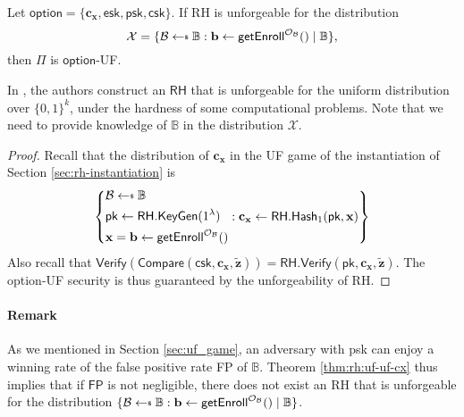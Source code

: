 \begin{theorem}
\label{thm:rh:uf-uf-cx}

Let $\textsf{option} = \{\mathbf{c_x}, \textsf{esk}, \textsf{psk}, \textsf{csk}\}$. If \textsf{RH} is unforgeable for the distribution
\[
	\mathcal{X} = \{ \mathcal{B} \getsdollar \mathbb{B}: \mathbf{b} \gets {\sf getEnroll}^{\mathcal{O}_\mathcal{B}}() \mid \mathbb{B} \},
\]
then $\Pi$ is $\textsf{option}$-UF. 

\end{theorem}

In \cite{cryptoeprint:2014/394}, the authors construct an $\textsf{RH}$ that is unforgeable for the uniform distribution over $\{0, 1\}^k$, under the hardness of some computational problems. Note that we need to provide knowledge of $\mathbb{B}$ in the distribution $\mathcal{X}$.

\begin{proof}

Recall that the distribution of $\mathbf{c_x}$ in the \textsf{UF} game of the instantiation of Section \ref{sec:rh-instantiation} is
\[
	\left \{
		\begin{aligned} 
			 & \mathcal{B} \getsdollar \mathbb{B} \\
			 & \textsf{pk} \gets \textsf{RH.KeyGen}(1^\lambda) \\
			 & \mathbf{x} = \mathbf{b} \gets \textsf{getEnroll}^{\mathcal{O}_\mathcal{B}}() 
		\end{aligned} :
		\mathbf{c_x} \gets \textsf{RH.Hash}_1(\textsf{pk}, \mathbf{x})
	\right \}
\]
Also recall that $\textsf{Verify}(\textsf{Compare}(\textsf{csk}, \mathbf{c_x}, \mathbf{\tilde{z}} )) = \textsf{RH.Verify}(\textsf{pk}, \mathbf{c_x}, \mathbf{\tilde{z}} )$.
The \textsf{option}-UF security is thus guaranteed by the unforgeability of \textsf{RH}.

\end{proof}

\paragraph{Remark}
As we mentioned in Section \ref{sec:uf_game}, an adversary with \textsf{psk} can enjoy a winning rate of the false positive rate \textsf{FP} of $\mathbb{B}$. Theorem \ref{thm:rh:uf-uf-cx} thus implies that if $\textsf{FP}$ is not negligible, there does not exist an \textsf{RH} that is unforgeable for the distribution $\{ \mathcal{B} \getsdollar \mathbb{B}: \mathbf{b} \gets {\sf getEnroll}^{\mathcal{O}_\mathcal{B}}() \mid \mathbb{B} \}$.


